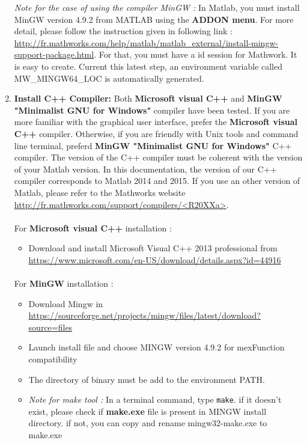 \begin{enumerate}
\textit{Note for the case of using the compiler MinGW :} In Matlab, you must install MinGW version 4.9.2 from MATLAB using the \textbf{ADDON menu}. For more detail, please follow the instruction given in following link :  
\url{http://fr.mathworks.com/help/matlab/matlab_external/install-mingw-support-package.html}. For that, you must have a id session for Mathwork. It is easy to create. 
Current this latest step, an environment variable called MW\_MINGW64\_LOC is automatically generated. 






\item \textbf{Install C++ Compiler:} Both \textbf{Microsoft visual C++} and \textbf{MinGW "Minimalist GNU for Windows"} compiler have been tested. If you are more familiar with the graphical user interface, prefer the \textbf{Microsoft visual C++} compiler. Otherwise, if you are friendly with Unix tools and command line terminal, preferd \textbf{MinGW "Minimalist GNU for Windows"} C++ compiler. The version of the C++ compiler must be coherent with the version of your Matlab version. In this documentation, the version of our C++ compiler corresponds to Matlab 2014 and 2015. If you use an other version of Matlab, please refer to the Mathworks website \url{http://fr.mathworks.com/support/compilers/<R20XXa>}.

\paragraph{}For \textbf{Microsoft visual C++} installation :
\begin{itemize}
\item Download and install Microsoft Visual C++ 2013 professional from \url{https://www.microsoft.com/en-US/download/details.aspx?id=44916}
\end{itemize}

\paragraph{}For \textbf{MinGW} installation :
\begin{itemize}
\item Download Mingw in \url{https://sourceforge.net/projects/mingw/files/latest/download?source=files}
\item Launch install file and choose MINGW version 4.9.2 for mexFunction compatibility 
\item The directory of binary must be add to the environment PATH. 

\item \textit{Note for make tool :} In a terminal command, type \texttt{make}. if it doesn't exist, please check if \textbf{make.exe} file is present in MINGW install directory. if not, you can copy and rename mingw32-make.exe to make.exe
\end{itemize}

\end{enumerate}
